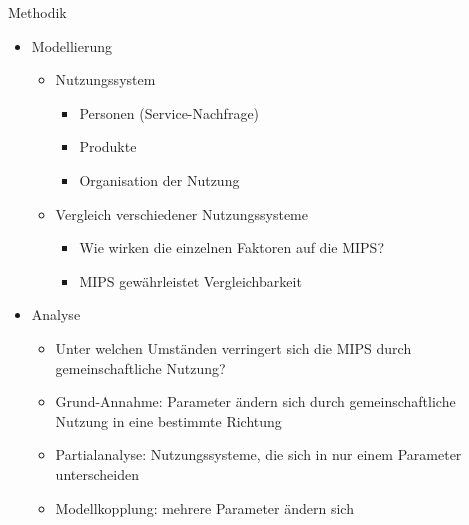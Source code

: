 \documentclass[beamer, xcolor=table]{beamer}
\begin{document}
	\begin{frame}{Methodik}
		\begin{center}
            \begin{itemize}
                \item Modellierung
                    \begin{itemize}
                        \item Nutzungssystem
                            \begin{itemize}
                                \item Personen (Service-Nachfrage)
                                \item Produkte
                                \item Organisation der Nutzung
                            \end{itemize}
                        \item Vergleich verschiedener Nutzungssysteme
                            \begin{itemize}
                                \item Wie wirken die einzelnen Faktoren auf die MIPS?
                                \item MIPS gewährleistet Vergleichbarkeit
                            \end{itemize}
                    \end{itemize}

                \item Analyse
                    \begin{itemize}
                        \item Unter welchen Umständen verringert sich die MIPS
                            durch gemeinschaftliche Nutzung?
                        \item Grund-Annahme: Parameter ändern sich durch
                            gemeinschaftliche Nutzung in eine bestimmte Richtung
                        \item Partialanalyse: Nutzungssysteme, die sich in nur
                            einem Parameter unterscheiden
                        \item Modellkopplung: mehrere Parameter ändern sich	
                    \end{itemize}
            \end{itemize}
		\end{center}
	\end{frame}
\end{document}
